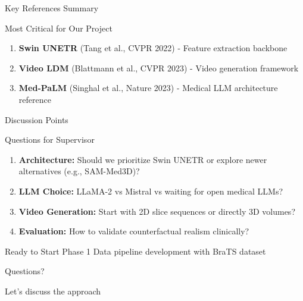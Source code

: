 \documentclass[aspectratio=169]{beamer}
\begin{document}
\begin{frame}{Key References Summary}
    \vspace{1em}
    
    \begin{alertblock}{Most Critical for Our Project}
        \begin{enumerate}
            \item \textbf{Swin UNETR} (Tang et al., CVPR 2022) - Feature extraction backbone
            \item \textbf{Video LDM} (Blattmann et al., CVPR 2023) - Video generation framework
            \item \textbf{Med-PaLM} (Singhal et al., Nature 2023) - Medical LLM architecture reference
        \end{enumerate}
    \end{alertblock}
\end{frame}

\begin{frame}{Discussion Points}
    \begin{block}{Questions for Supervisor}
        \begin{enumerate}
            \item \textbf{Architecture:} Should we prioritize Swin UNETR or explore newer alternatives (e.g., SAM-Med3D)?
            \item \textbf{LLM Choice:} LLaMA-2 vs Mistral vs waiting for open medical LLMs?
            \item \textbf{Video Generation:} Start with 2D slice sequences or directly 3D volumes?
            \item \textbf{Evaluation:} How to validate counterfactual realism clinically?
        \end{enumerate}
    \end{block}
    
    \begin{alertblock}{Ready to Start Phase 1}
        Data pipeline development with BraTS dataset
    \end{alertblock}
\end{frame}

\begin{frame}[standout]
    \centering
    \Huge Questions?
    
    \vspace{1cm}
    \Large Let's discuss the approach
\end{frame}
\end{document}
